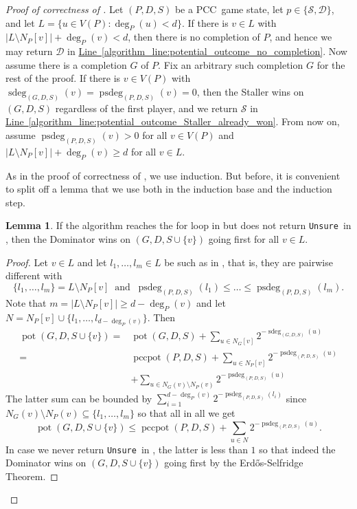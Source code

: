 \documentclass[a4paper,11pt,oneside]{scrartcl}
\theoremstyle{definition}
\newtheorem{lemma}[definition]{Lemma}
\theoremstyle{remark}
\DeclareMathOperator{\pot}{pot}
\DeclareMathOperator{\gsdeg}{sdeg}
\DeclareMathOperator{\pccgsdeg}{psdeg}
\DeclareMathOperator{\pccpot}{pccpot}
\newcommand{\pcc}{PCC}
\newcommand{\pccgs}{\pcc\ game state}
\newcommand{\lineref}[1]{\hyperref[#1]{Line~\ref{#1}}}
\newcommand{\unsure}{\texttt{Unsure}}
\begin{document}
\begin{proof}[Proof of correctness of ]
    Let $(P,D,S)$ be a \pccgs, let $p \in \{\mathcal S, \mathcal D\}$, and let $L = \{u \in V(P) : \deg_{P}(u) < d\}$. If there is $v\in L$ with $|L \setminus N_P[v]| + \deg_P(v)< d$, then there is no completion of $P$, and hence we may return $\mathcal D$ in \lineref{algorithm_line:potential_outcome_no_completion}. Now assume there is a completion $G$ of $P$. Fix an arbitrary such completion $G$ for the rest of the proof. If there is $v \in V(P)$ with $\gsdeg_{(G,D,S)}(v) = \pccgsdeg_{(P,D,S)}(v)= 0$, then the Staller wins on $(G,D,S)$ regardless of the first player, and we return $\mathcal S$ in \lineref{algorithm_line:potential_outcome_Staller_already_won}. From now on, assume $\pccgsdeg_{(P,D,S)}(v) > 0$ for all $v \in V(P)$ and $|L \setminus N_P[v]| + \deg_P(v)\geq d$ for all $v \in L$.
    
    As in the proof of correctness of , we use induction. But before, it is convenient to split off a lemma that we use both in the induction base and the induction step. 

    \begin{lemma}\label{lemma:potential_outcome_low_deg_vtx_lemma}
        If the algorithm reaches the for loop in  but does not return \unsure\ in , then the Dominator wins on $(G,D,S\cup \{v\})$ going first for all $v \in L$.
    \end{lemma}
    \begin{proof}
        Let $v \in L$ and let $l_1,\dots,l_m \in L$ be such as in , that is, they are pairwise different with
    \[
        \{l_1,\dots,l_m\} = L \setminus N_P[v] \ \text{ and } \ \pccgsdeg_{(P,D,S)}(l_1) \leq \dots \leq \pccgsdeg_{(P,D,S)}(l_m).
    \]
    Note that $m = |L \setminus N_P[v]| \geq d - \deg_P(v)$ and let $N =  N_P[v] \cup \{l_1, \dots, l_{d - \deg_P(v)}\}$. Then 
    \begin{align*}
        \pot(G,D,S\cup \{v\}) =& \pot(G,D,S) + \sum_{u \in N_{G}[v]} 2^{-\gsdeg_{(G,D,S)}(u)}\\ 
        =& \pccpot(P,D,S) + \sum_{u \in N_P[v]} 2^{-\pccgsdeg_{(P,D,S)}(u)}\\ 
        &+ \sum_{u \in N_G(v) \setminus N_P(v)}2^{-\pccgsdeg_{(P,D,S)}(u)}
    \end{align*}
    The latter sum can be bounded by $\sum_{i = 1}^{d- \deg_P(v)}2^{-\pccgsdeg_{(P,D,S)}(l_i)}$ since $N_G(v) \setminus N_P(v) \subseteq \{l_1,\dots,l_m\}$ so that all in all we get 
    \[\pot(G,D,S\cup \{v\}) \leq \pccpot(P,D,S) + \sum_{u \in N} 2^{-\pccgsdeg_{(P,D,S)}(u)}.\]
    In case we never return \unsure\ in , the latter is less than $1$ so that indeed the Dominator wins on $(G,D,S\cup \{v\})$ going first by the Erd\H os-Selfridge Theorem.
    \end{proof}


\end{proof}
\end{document}
